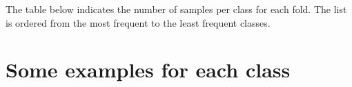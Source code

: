 \documentclass{article}
\begin{document}
The table below indicates the number of samples per class for each fold. The list is ordered from the most frequent to the least frequent classes.



\pagebreak\newpage
\section*{Some examples for each class}


\end{document}
